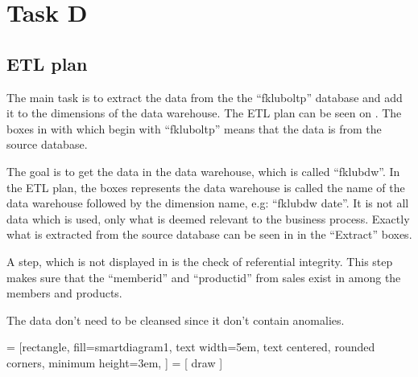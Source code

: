\section{Task D}

\subsection{ETL plan}
The main task is to extract the data from the the ``fkluboltp'' database and add it to the dimensions of the data warehouse.
The ETL plan can be seen on . 
The boxes in  with which begin with ``fkluboltp'' means that the data is from the source database. 

The goal is to get the data in the data warehouse, which is called ``fklubdw''. 
In the ETL plan, the boxes represents the data warehouse is called the name of the data warehouse followed by the dimension name, e.g: ``fklubdw date''.
It is not all data which is used, only what is deemed relevant to the business process.
Exactly what is extracted from the source database can be seen in  in the ``Extract'' boxes. 

A step, which is not displayed in  is the check of referential integrity.
This step makes sure that the ``memberid'' and ``productid'' from sales exist in among the members and products. 

The data don't need to be cleansed since it don't contain anomalies. 

 = [rectangle,
    fill=smartdiagram1,
    text width=5em,
    text centered,
    rounded corners,
    minimum height=3em,
]
 = [
    draw
]

